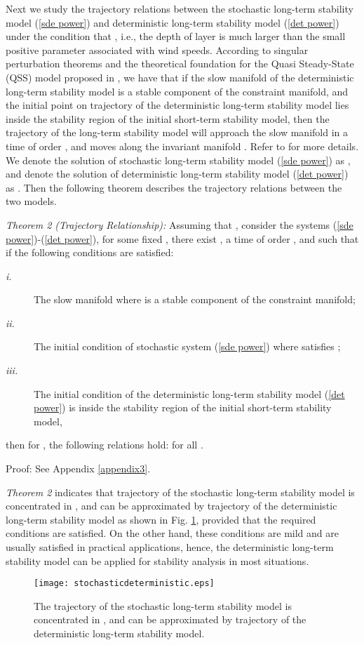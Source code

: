 \documentclass[journal]{IEEEtran}
\begin{document}
Next we study the trajectory relations between the stochastic long-term stability model (\ref{sde power}) and deterministic long-term stability model (\ref{det power}) under the condition that , i.e., the depth  of layer  is much larger than the small positive parameter  associated with wind speeds. According to singular perturbation theorems\cite{Khalil:book}\cite{Lobry:article2} and the theoretical foundation for the Quasi Steady-State (QSS) model proposed in \cite{Wangxz:CAS}, we have that if the slow manifold  of the deterministic long-term stability model is a stable component of the constraint manifold, and the initial point on trajectory of the deterministic long-term stability model lies inside the stability region of the initial short-term stability model, then the trajectory of the long-term stability model will approach the slow manifold in a time of order , and moves along the invariant manifold . Refer to \cite{Wangxz:CAS} for more details. 
We denote the solution of stochastic long-term stability model (\ref{sde power}) as , and denote the solution of deterministic long-term stability model (\ref{det power}) as . Then the following theorem describes the trajectory relations between the two models.

\textit{Theorem 2 (Trajectory Relationship):} Assuming that , consider the systems (\ref{sde power})-(\ref{det power}), for some fixed , there exist , a time  of order , and  such that if the following conditions are satisfied:

\begin{description}
\item [\textit{i.}] The slow manifold  where  is a stable component of the constraint manifold;
\item [\textit{ii.}] The initial condition of stochastic system (\ref{sde power})  where  satisfies ; \item [\textit{iii.}] The initial condition  of the deterministic long-term stability model (\ref{det power}) is inside the stability region of the initial short-term stability model,
\end{description}

then for , the following relations hold: 
for all .


Proof: See Appendix \ref{appendix3}.


\textit{Theorem 2} indicates that trajectory of the stochastic long-term stability model is concentrated in , and can be approximated by trajectory of the deterministic long-term stability model as shown in Fig. \ref{stochasticdeterministic}, provided that the required conditions are satisfied. On the other hand, these conditions are mild and are usually satisfied in practical applications, hence, the deterministic long-term stability model can be applied for stability analysis in most situations. 
\begin{figure}[!ht]
\centering
\texttt{[image: stochasticdeterministic.eps]}\caption{The trajectory  of the stochastic long-term stability model is concentrated in , and can be approximated by trajectory  of the deterministic long-term stability model. }\label{stochasticdeterministic}
\end{figure}
\end{document}
